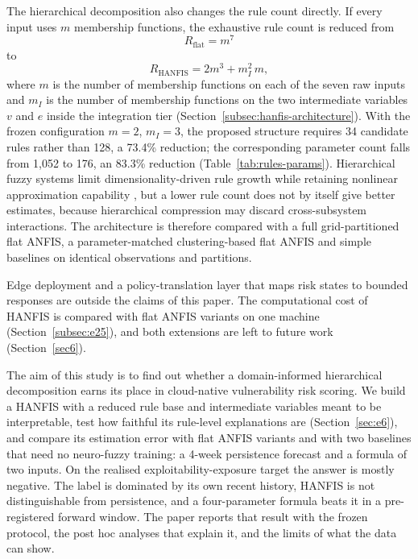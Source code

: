 \documentclass[referee,lineno,pdflatex,sn-basic]{sn-jnl}%
\theoremstyle{thmstyleone}%
\theoremstyle{thmstyletwo}%
\theoremstyle{thmstylethree}%
\begin{document}
The hierarchical decomposition also changes the rule count directly. If every input uses $m$ membership functions, the exhaustive rule count is reduced from
\begin{equation}
R_{\mathrm{flat}}=m^{7}
\end{equation}
to
\begin{equation}
R_{\mathrm{HANFIS}}=2m^{3}+m_I^{2}\,m,
\end{equation}
where $m$ is the number of membership functions on each of the seven raw inputs and $m_I$ is the number of membership functions on the two intermediate variables $v$ and $e$ inside the integration tier (Section~\ref{subsec:hanfis-architecture}).
With the frozen configuration $m=2$, $m_I=3$, the proposed structure requires 34 candidate rules rather than 128, a 73.4\% reduction; the corresponding parameter count falls from 1{,}052 to 176, an 83.3\% reduction (Table~\ref{tab:rules-params}). Hierarchical fuzzy systems limit dimensionality-driven rule growth while retaining nonlinear approximation capability \citep{wang1998hierarchical,ojha2019heuristic}, but a lower rule count does not by itself give better estimates, because hierarchical compression may discard cross-subsystem interactions. The architecture is therefore compared with a full grid-partitioned flat ANFIS, a parameter-matched clustering-based flat ANFIS and simple baselines on identical observations and partitions.

Edge deployment and a policy-translation layer that maps risk states to bounded responses are outside the claims of this paper. The computational cost of HANFIS is compared with flat ANFIS variants on one machine (Section~\ref{subsec:e25}), and both extensions are left to future work (Section~\ref{sec6}).

The aim of this study is to find out whether a domain-informed hierarchical decomposition earns its place in cloud-native vulnerability risk scoring. We build a HANFIS with a reduced rule base and intermediate variables meant to be interpretable, test how faithful its rule-level explanations are (Section~\ref{sec:e6}), and compare its estimation error with flat ANFIS variants and with two baselines that need no neuro-fuzzy training: a 4-week persistence forecast and a formula of two inputs. On the realised exploitability-exposure target the answer is mostly negative. The label is dominated by its own recent history, HANFIS is not distinguishable from persistence, and a four-parameter formula beats it in a pre-registered forward window. The paper reports that result with the frozen protocol, the post hoc analyses that explain it, and the limits of what the data can show.
\end{document}
